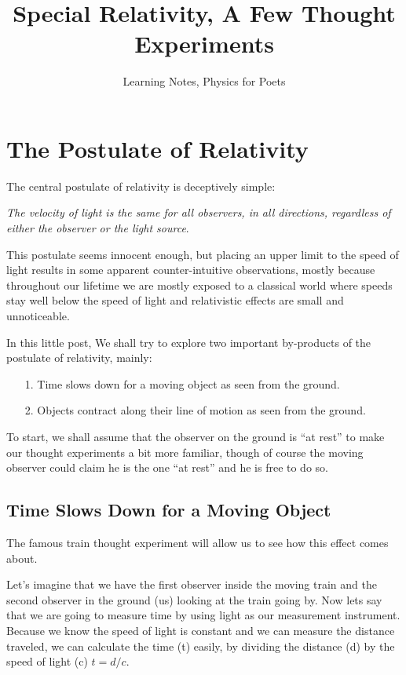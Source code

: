 \documentclass[12pt, letterpaper]{article}
\title{Special Relativity, A Few Thought Experiments}
\author{Learning Notes, Physics for Poets}
\date{}
\begin{document}
    \maketitle

    \section{The Postulate of Relativity}
    The central postulate of relativity is deceptively simple:
    
    \medskip\textit{The velocity of light is the same for all observers, 
    in all directions, regardless of either the observer or the light source}.
    
    \medskip
    This postulate seems innocent enough, but placing 
    an upper limit to the speed of light results in some apparent 
    counter-intuitive observations, mostly because throughout our 
    lifetime we are mostly exposed to a classical world where speeds 
    stay well below the speed of light and relativistic effects are small 
    and unnoticeable.
    
    In this little post, We shall try to explore two important by-products of 
    the postulate of relativity, mainly:
    \begin{itemize}
        \item[1. ] Time slows down for a moving object as seen from the ground.
        \item[2. ] Objects contract along their line of motion as seen from the 
        ground.
    \end{itemize}

    To start, we shall assume that the observer on the ground is ``at rest'' 
    to make our thought experiments a bit more familiar, though of course 
    the moving observer could claim he is the one ``at rest'' and he is free 
    to do so.
    
    \subsection*{Time Slows Down for a Moving Object}
    The famous train thought experiment will allow us to see how this effect 
    comes about.
    
    Let's imagine that we have the first observer inside the moving train 
    and the second observer in the ground (us) looking at the train going by.
    Now lets say that we are going to measure time by using light as our 
    measurement instrument. Because we know the speed of light is constant 
    and we can measure the distance traveled, we can calculate the time (t) 
    easily, by dividing the distance (d) by the speed of light (c) $t=d/c$. 
    
\end{document}
